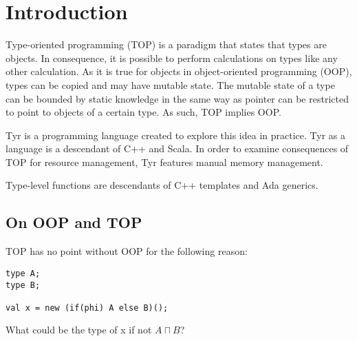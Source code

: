 
\section{Introduction}

Type-oriented programming (TOP) is a paradigm that states that types are objects.
In consequence, it is possible to perform calculations on types like any other calculation.
As it is true for objects in object-oriented programming (OOP), types can be copied and may have mutable state.
The mutable state of a type can be bounded by static knowledge in the same way as pointer can be restricted to point to objects of a certain type.
As such, TOP implies OOP.

Tyr is a programming language created to explore this idea in practice.
Tyr as a language is a descendant of C++ and Scala.
In order to examine consequences of TOP for resource management, Tyr features manual memory management.

Type-level functions are descendants of C++ templates and Ada generics.


\subsection{On OOP and TOP}

TOP has no point without OOP for the following reason:

\begin{lstlisting}
type A;
type B;

val x = new (if(phi) A else B)();
\end{lstlisting}

What could be the type of x if not $A \sqcap B$?